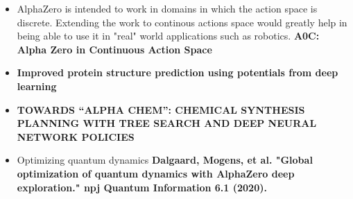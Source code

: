 \begin{itemize}
    \item AlphaZero is intended to work in domains in which the action space is discrete. Extending the work to continous actions space would greatly help in being able to use it in "real" world applications such as robotics.
    \textbf{A0C: Alpha Zero in Continuous Action Space}
    \cite{aocalphazero}
    
    \item \textbf{Improved protein structure prediction using potentials from deep learning}
    \cite{alphafold}
    
    \item \textbf{TOWARDS “ALPHA CHEM”: CHEMICAL SYNTHESIS PLANNING WITH TREE SEARCH AND
    DEEP NEURAL NETWORK POLICIES}
    \cite{alphachem}
    
    \item Optimizing quantum dynamics
    \textbf{Dalgaard, Mogens, et al. "Global optimization of quantum dynamics with AlphaZero deep exploration." npj Quantum Information 6.1 (2020).}
    \cite{alphaquantum} 
    
\end{itemize}

